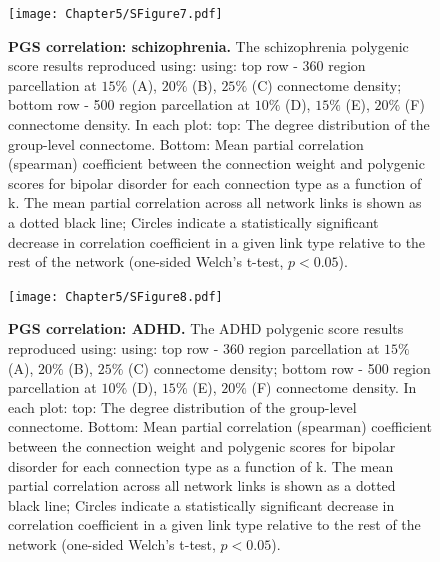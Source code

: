 \begin{figure}[h!]
\begin{center}
\texttt{[image: Chapter5/SFigure7.pdf]}%
\end{center}
\caption{\textbf{PGS correlation: schizophrenia.} 
The schizophrenia polygenic score results reproduced using: using: top row - 360 region parcellation at $15\%$ (A), $20\%$ (B), $25\%$ (C) connectome density; bottom row - 500 region parcellation at $10\%$ (D), $15\%$ (E), $20\%$ (F) connectome density. In each plot: top: The degree distribution of the group-level connectome. Bottom: Mean partial correlation (spearman) coefficient between the connection weight and polygenic scores for bipolar disorder for each connection type as a function of k. The mean partial correlation across all network links is shown as a dotted black line; Circles indicate a statistically significant decrease in correlation coefficient in a given link type relative to the rest of the network (one-sided Welch's t-test, $p < 0.05$).}
\label{fig:Ch5SFig7}
\end{figure}

\begin{figure}[h!]
\begin{center}
\texttt{[image: Chapter5/SFigure8.pdf]}%
\end{center}
\caption{\textbf{PGS correlation: ADHD.} 
The ADHD polygenic score results reproduced using: using: top row - 360 region parcellation at $15\%$ (A), $20\%$ (B), $25\%$ (C) connectome density; bottom row - 500 region parcellation at $10\%$ (D), $15\%$ (E), $20\%$ (F) connectome density. In each plot: top: The degree distribution of the group-level connectome. Bottom: Mean partial correlation (spearman) coefficient between the connection weight and polygenic scores for bipolar disorder for each connection type as a function of k. The mean partial correlation across all network links is shown as a dotted black line; Circles indicate a statistically significant decrease in correlation coefficient in a given link type relative to the rest of the network (one-sided Welch's t-test, $p < 0.05$).}
\label{fig:Ch5SFig8}
\end{figure}


